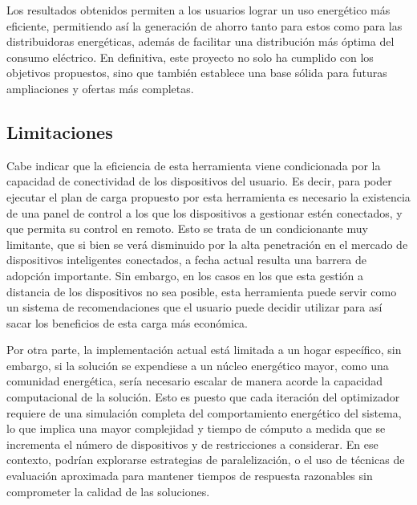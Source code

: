 \documentclass[11pt,a4paper]{book}
\begin{document}
Los resultados obtenidos permiten a los usuarios lograr un uso energético más eficiente, permitiendo así la generación de ahorro tanto para estos como para las distribuidoras energéticas, además de facilitar una distribución más óptima del consumo eléctrico. En definitiva, este proyecto no solo ha cumplido con los objetivos propuestos, sino que también establece una base sólida para futuras ampliaciones y ofertas más completas.

\subsection{Limitaciones}
Cabe indicar que la eficiencia de esta herramienta viene condicionada por la capacidad de conectividad de los dispositivos del usuario. Es decir, para poder ejecutar el plan de carga propuesto por esta herramienta es necesario la \mbox{existencia} de una panel de control a los que los dispositivos a gestionar estén conectados, y que permita su control en remoto. Esto se trata de un condicionante muy limitante, que si bien se verá disminuido por la alta penetración en el mercado de dispositivos inteligentes conectados, a fecha actual resulta una barrera de adopción importante. Sin embargo, en los casos en los que esta gestión a distancia de los dispositivos no sea posible, esta herramienta puede servir como un sistema de recomendaciones que el usuario puede decidir utilizar para así sacar los beneficios de esta carga más económica.

Por otra parte, la implementación actual está limitada a un hogar específico, sin embargo, si la solución se expendiese a un núcleo energético mayor, como una comunidad energética, sería necesario escalar de manera acorde la capacidad computacional de la solución. Esto es puesto que cada iteración del optimizador requiere de una simulación completa del comportamiento energético del sistema, lo que implica una mayor complejidad y tiempo de cómputo a medida que se incrementa el número de dispositivos y de restricciones a considerar. En ese contexto, podrían explorarse estrategias de paralelización, o el uso de técnicas de evaluación aproximada para mantener tiempos de respuesta razonables sin comprometer la calidad de las soluciones.
\end{document}
